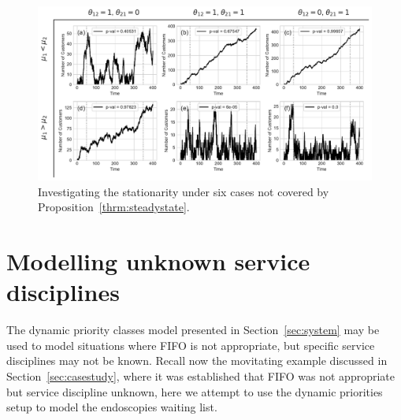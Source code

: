 \documentclass{article}
\begin{document}
\begin{figure}
  \begin{center}
    \includegraphics[width=\textwidth]{img/adf_theorem_gap.pdf}
    \caption{Investigating the stationarity under six cases not covered by
    Proposition~\ref{thrm:steadystate}.}
    \label{fig:adf_gap}
  \end{center}
\end{figure}


\section{Modelling unknown service disciplines}\label{sec:modelling}
The dynamic priority classes model presented in Section~\ref{sec:system} may be
used to model situations where FIFO is not appropriate, but specific service
disciplines may not be known. Recall now the movitating example
discussed in Section~\ref{sec:casestudy}, where it was established that FIFO was
not appropriate but service discipline unknown, here we attempt to use the
dynamic priorities setup to model the endoscopies waiting list.
\end{document}
